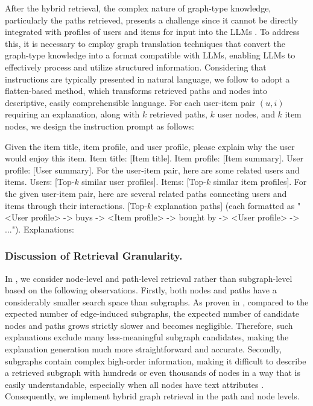 After the hybrid retrieval, the complex nature of graph-type knowledge, particularly the paths retrieved, presents a challenge since it cannot be directly integrated with profiles of users and items for input into the LLMs \cite{wang2024can,chen2024graphwiz}. To address this, it is necessary to employ graph translation techniques that convert the graph-type knowledge into a format compatible with LLMs, enabling LLMs to effectively process and utilize structured information. Considering that instructions are typically presented in natural language, we follow \cite{tan2024walklm,ye2023natural} to adopt a flatten-based method, which transforms retrieved paths and nodes into descriptive, easily comprehensible language. For each user-item pair $(u, i)$ requiring an explanation, along with $k$ retrieved paths, $k$ user nodes, and $k$ item nodes, we design the instruction prompt as follows:

\begin{tcolorbox}[
    enhanced,
    boxsep=2pt, 
    left=2pt, 
    right=2pt, 
    top=2pt, 
    bottom=2pt, 
    boxrule=0.5pt, 
    arc=2pt, 
    colback=white, 
    colframe=black, 
    fonttitle=\bfseries,
    fontupper=\footnotesize 
]
\small
Given the item title, item profile, and user profile, please explain why the user would enjoy this item. Item title: \textcolor[HTML]{4169E1}{[Item title]}. Item profile: \textcolor[HTML]{4169E1}{[Item summary]}. User profile: \textcolor[HTML]{4169E1}{[User summary]}.  For the user-item pair, here are some related users and items. Users: \textcolor[HTML]{4169E1}{[Top-$k$ similar user profiles]}. Items: \textcolor[HTML]{4169E1}{[Top-$k$ similar item profiles]}. For the given user-item pair, here are several related paths connecting users and items through their interactions. \textcolor[HTML]{4169E1}{[Top-$k$ explanation paths]} (each formatted as "<User profile> -> buys -> <Item profile> -> bought by -> <User profile> -> ...").
Explanations:
\end{tcolorbox}

\subsubsection{Discussion of Retrieval Granularity.} 

In \model, we consider node-level and path-level retrieval rather than subgraph-level based on the following observations. Firstly, both nodes and paths have a considerably smaller search space than subgraphs. As proven in \cite{zhang2023page}, compared to the expected number of edge-induced subgraphs, the expected number of candidate nodes and paths grows strictly slower and becomes negligible. Therefore, such explanations exclude many less-meaningful subgraph candidates, making the explanation generation much more straightforward and accurate. Secondly, subgraphs contain complex high-order information, making it difficult to describe a retrieved subgraph with hundreds or even thousands of nodes in a way that is easily understandable, especially when all nodes have text attributes \cite{liuone}. Consequently, we implement hybrid graph retrieval in the path and node levels.

